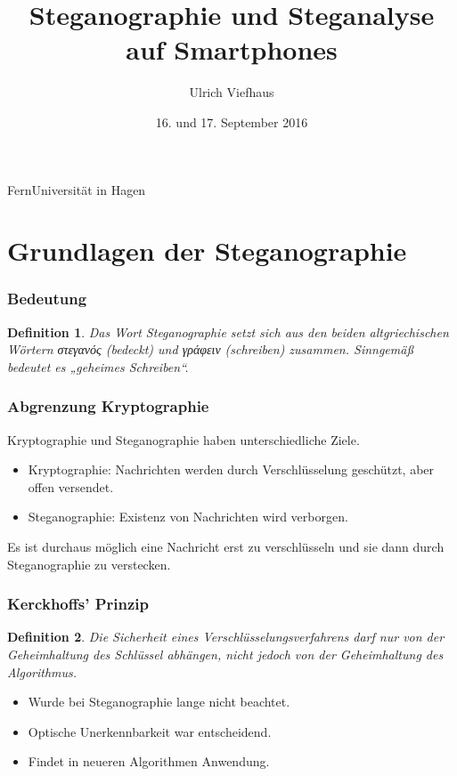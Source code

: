 \documentclass{beamer}
\newtheorem{mydef}{Definition}
\begin{document}
\title{Steganographie und Steganalyse auf Smartphones}
\author{Ulrich Viefhaus}
\institute
{
  FernUniversität in Hagen
}
\date{16. und 17. September 2016}
\subject{Steganographie, Inforation Hiding, Steganalysis}

\frame[allowframebreaks]{\titlepage}

\section{Grundlagen der Steganographie}

\begin{frame}
    \frametitle{Bedeutung}
    \begin{mydef}
    Das Wort Steganographie setzt sich aus den beiden altgriechischen Wörtern \textgreek[variant=ancient]{στεγανός} (bedeckt) und \textgreek[variant=ancient]{γράφειν} (schreiben) zusammen. Sinngemäß bedeutet es „geheimes Schreiben“.
  \end{mydef}
\end{frame}

\begin{frame}
    \frametitle{Abgrenzung Kryptographie}
    Kryptographie und Steganographie haben unterschiedliche Ziele.
	  \begin{itemize}
	    \item Kryptographie: Nachrichten werden durch Verschlüsselung geschützt, aber offen versendet.
	    \item Steganographie: Existenz von Nachrichten wird verborgen.
	  \end{itemize}
	  Es ist durchaus möglich eine Nachricht erst zu verschlüsseln und sie dann durch Steganographie zu verstecken.
\end{frame}
  
\begin{frame}
    \frametitle{Kerckhoffs' Prinzip}
    \begin{mydef}
      Die Sicherheit eines Verschlüsselungsverfahrens darf nur von der Geheimhaltung des Schlüssel abhängen, nicht jedoch von der Geheimhaltung des Algorithmus.
  \end{mydef}
    \begin{itemize}
      \item Wurde bei Steganographie lange nicht beachtet.
      \item Optische Unerkennbarkeit war entscheidend.
      \item Findet in neueren Algorithmen Anwendung.
    \end{itemize}
\end{frame}
\end{document}
